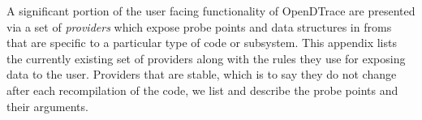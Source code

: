 A significant portion of the user facing functionality of OpenDTrace
are presented via a set of \emph{providers} which expose probe points
and data structures in froms that are specific to a particular type of
code or subsystem.  This appendix lists the currently existing set of
providers along with the rules they use for exposing data to the
user.  Providers that are stable, which is to say they do not change
after each recompilation of the code, we list and describe the probe
points and their arguments.

